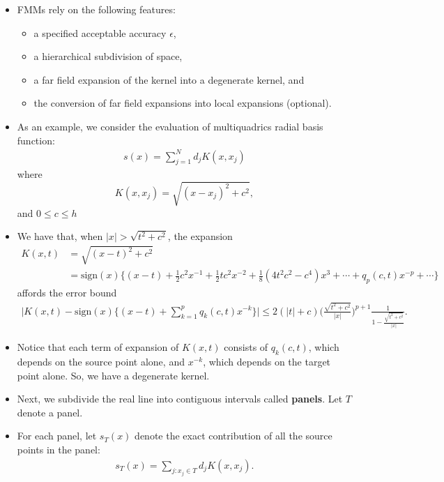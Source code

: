 \documentclass[10pt]{article}
\newcommand{\sign}{\mathrm{sign}}
\begin{document}
\begin{itemize}
  \item FMMs rely on the following features:
  \begin{itemize}
    \item a specified acceptable accuracy $\epsilon$,
    \item a hierarchical subdivision of space,
    \item a far field expansion of the kernel into a degenerate kernel, and
    \item the conversion of far field expansions into local expansions (optional).
  \end{itemize}
  
  \item As an example, we consider the evaluation of multiquadrics radial basis function:
  \begin{align*}
    s(x) = \sum_{j=1}^N d_j K(x, x_j)
  \end{align*}
  where $$K(x, x_j) = \sqrt{(x-x_j)^2 + c^2},$$ and $0 \leq c \leq h$
  
  \item We have that, when $|x| > \sqrt{t^2 + c^2}$, the expansion
  \begin{align*}
    K(x, t)
    &= \sqrt{(x-t)^2 + c^2}\\
    &= \sign(x) \bigg\{ (x-t) + \frac{1}{2}c^2 x^{-1} + \frac{1}{2} tc^2 x^{-2} + \frac{1}{8}(4t^2 c^2 -c^4) x^3 + \dotsb + q_p(c,t) x^{-p} + \dotsb \bigg\}
  \end{align*}
  affords the error bound
  \begin{align*}
  \bigg| K(x,t) - \sign(x) \bigg\{ (x-t) + \sum_{k=1}^p q_k(c,t) x^{-k} \bigg\} \bigg|  
  \leq 2(|t|+c) \bigg( \frac{\sqrt{t^2 + c^2}}{|x|} \bigg)^{p+1} \frac{1}{1 - \frac{\sqrt{t^2+c^2}}{|x|}}.
  \end{align*}
  
  \item Notice that each term of expansion of $K(x,t)$ consists of $q_k(c,t)$, which depends on the source point alone, and $x^{-k}$, which depends on the target point alone. So, we have a degenerate kernel.
  
  \item Next, we subdivide the real line into contiguous intervals called \textbf{panels}. Let $T$ denote a panel.
  
  \item For each panel, let $s_T(x)$ denote the exact contribution of all the source points in the panel:
  \begin{align*}
    s_T(x) = \sum_{j: x_j \in T} d_j K(x, x_j).
  \end{align*}
  

\end{itemize}
\end{document}
